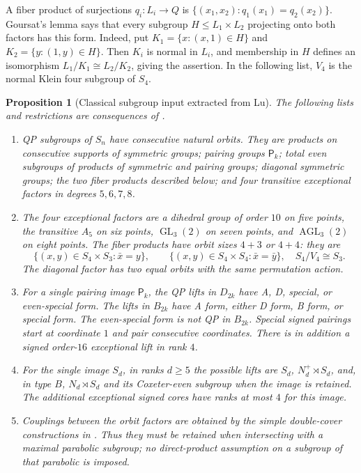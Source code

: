 \documentclass[11pt]{article}
\numberwithin{equation}{section}
\newtheorem{proposition}[theorem]{Proposition}
\theoremstyle{definition}
\DeclareMathOperator{\GL}{GL}
\DeclareMathOperator{\AGL}{AGL}
\newcommand{\pair}{\mathsf P}
\begin{document}
A fiber product of surjections \(q_i:L_i\to Q\) is
\(\{(x_1,x_2):q_1(x_1)=q_2(x_2)\}\).
Goursat's lemma says that every subgroup \(H\leq L_1\times L_2\) projecting onto both factors has this form.
Indeed, put \(K_1=\{x:(x,1)\in H\}\) and \(K_2=\{y:(1,y)\in H\}\).
Then \(K_i\) is normal in \(L_i\), and membership in \(H\) defines an isomorphism \(L_1/K_1\cong L_2/K_2\), giving the assertion.
In the following list, \(V_4\) is the normal Klein four subgroup of \(S_4\).

\begin{proposition}[Classical subgroup input extracted from Lu]
\label{prop:Lu}
The following lists and restrictions are consequences of
\cite[Theorems 11, 13, 16; Definitions 9--13; Examples 20--21]{Lu}.
\begin{enumerate}[label=(\roman*)]
\item QP subgroups of \(S_n\) have consecutive natural orbits.
They are products on consecutive supports of symmetric groups; pairing groups \(\pair_k\); total even subgroups of products of symmetric and pairing groups; diagonal symmetric groups; the two fiber products described below; and four transitive exceptional factors in degrees \(5,6,7,8\).
\item The four exceptional factors are a dihedral group of order \(10\) on five points, the transitive \(A_5\) on six points, \(\GL_3(2)\) on seven points, and \(\AGL_3(2)\) on eight points.
The fiber products have orbit sizes \(4+3\) or \(4+4\): they are
\[
 \{(x,y)\in S_4\times S_3:\bar x=y\},\qquad
 \{(x,y)\in S_4\times S_4:\bar x=\bar y\},
 \quad S_4/V_4\cong S_3 .
\]
The diagonal factor has two equal orbits with the same permutation action.
\item For a single pairing image \(\pair_k\), the QP lifts in \(D_{2k}\) have A, D, special, or even-special form.
The lifts in \(B_{2k}\) have A form, either D form, B form, or special form.
The even-special form is not QP in \(B_{2k}\).
Special signed pairings start at coordinate \(1\) and pair consecutive coordinates.
There is in addition a signed order-\(16\) exceptional lift in rank \(4\).
\item For the single image \(S_d\), in ranks \(d\geq5\) the possible lifts are \(S_d\), \(N_d^+\rtimes S_d\), and, in type \(B\), \(N_d\rtimes S_d\) and its Coxeter-even subgroup when the image is retained.
The additional exceptional signed cores have ranks at most \(4\) for this image.
\item Couplings between the orbit factors are obtained by the simple double-cover constructions in \cite[Theorem 16]{Lu}.
Thus they must be retained when intersecting with a maximal parabolic subgroup; no direct-product assumption on a subgroup of that parabolic is imposed.
\end{enumerate}
\end{proposition}
\end{document}
